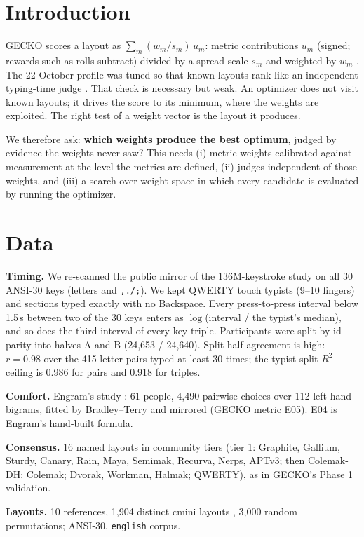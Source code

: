 \documentclass{gecko-paper}
\begin{document}
\begin{paperbody}
\section{Introduction}
GECKO scores a layout as $\sum_m (w_m/s_m)\,u_m$: metric contributions $u_m$ (signed; rewards such as rolls subtract) divided by a spread scale $s_m$ and weighted by $w_m$ . The 22 October profile was tuned so that known layouts rank like an independent typing-time judge . That check is necessary but weak. An optimizer does not visit known layouts; it drives the score to its minimum, where the weights are exploited. The right test of a weight vector is the layout it produces.

We therefore ask: \textbf{which weights produce the best optimum}, judged by evidence the weights never saw? This needs (i) metric weights calibrated against measurement at the level the metrics are defined, (ii) judges independent of those weights, and (iii) a search over weight space in which every candidate is evaluated by running the optimizer.

\section{Data}
\textbf{Timing.} We re-scanned the public mirror of the 136M-keystroke study  on all 30 ANSI-30 keys (letters and \texttt{,./;}). We kept QWERTY touch typists (9–10 fingers) and sections typed exactly with no Backspace. Every press-to-press interval below 1.5\,s between two of the 30 keys enters as $\log$(interval / the typist's median), and so does the third interval of every key triple. Participants were split by id parity into halves A and B (24{,}653 / 24{,}640). Split-half agreement is high: $r=0.98$ over the 415 letter pairs typed at least 30 times; the typist-split $R^2$ ceiling is 0.986 for pairs and 0.918 for triples.

\textbf{Comfort.} Engram's study : 61 people, 4{,}490 pairwise choices over 112 left-hand bigrams, fitted by Bradley–Terry and mirrored (GECKO metric E05). E04 is Engram's hand-built formula.

\textbf{Consensus.} 16 named layouts in community tiers (tier 1: Graphite, Gallium, Sturdy, Canary, Rain, Maya, Semimak, Recurva, Nerps, APTv3; then Colemak-DH; Colemak; Dvorak, Workman, Halmak; QWERTY), as in GECKO's Phase 1 validation.

\textbf{Layouts.} 10 references, 1{,}904 distinct cmini layouts , 3{,}000 random permutations; ANSI-30, \texttt{english} corpus.


\end{paperbody}
\end{document}
